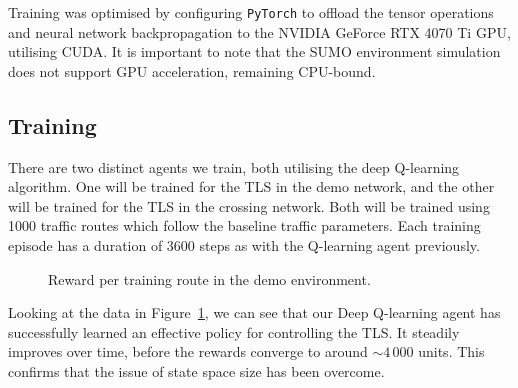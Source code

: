 \documentclass[a4paper]{report}
\begin{document}
Training was optimised by configuring \texttt{PyTorch} to offload the tensor operations and neural network backpropagation to the NVIDIA GeForce RTX 4070 Ti GPU, utilising CUDA. It is important to note that the SUMO environment simulation does not support GPU acceleration, remaining CPU-bound.

\subsection{Training}

There are two distinct agents we train, both utilising the deep Q-learning algorithm. One will be trained for the TLS in the demo network, and the other will be trained for the TLS in the crossing network. Both will be trained using 1000 traffic routes which follow the baseline traffic parameters. Each training episode has a duration of 3600 steps as with the Q-learning agent previously.

\begin{figure}[H]
  \centering
  \caption{Reward per training route in the demo environment.}
  \label{fig:deep_q_learning_demo_train}
\end{figure}

Looking at the data in Figure~\ref{fig:deep_q_learning_demo_train}, we can see that our Deep Q-learning agent has successfully learned an effective policy for controlling the TLS. It steadily improves over time, before the rewards converge to around $\sim4\,000$ units. This confirms that the issue of state space size has been overcome.
\end{document}
